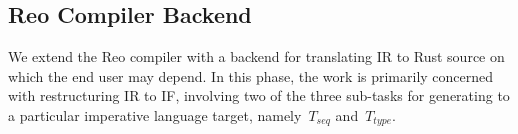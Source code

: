 %
%

\subsection{Reo Compiler Backend}
\label{sec:translation_phase_1}
We extend the Reo compiler with a backend for translating IR to Rust source on which the end user may depend. In this phase, the work is primarily concerned with restructuring IR to IF, involving two of the three sub-tasks for generating to a particular imperative language target, namely~$T_{seq}$ and~$T_{type}$. 


